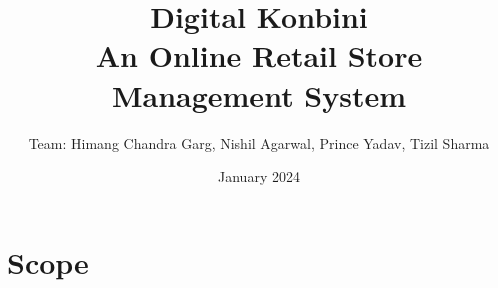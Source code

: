 \documentclass{article}
\title{\textbf{Digital Konbini \\ An Online Retail Store Management System}}
\author{ Team: Himang Chandra Garg, Nishil Agarwal, Prince Yadav, Tizil Sharma}
\date{January 2024}
\begin{document}
\maketitle

\section{Scope}

\end{document}
